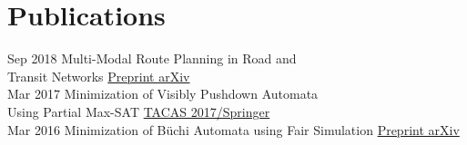\documentclass[letterpaper]{twentysecondcv} %
\begin{document}
\section{Publications}
\begin{twenty} %
	\twentyitem
    		{Sep 2018}
		{}
        		{Multi-Modal Route Planning in Road and\\Transit Networks}
        		{\href{https://arxiv.org/abs/1809.05481}{Preprint arXiv}}
        		{}
        		{}\\
	\twentyitem
    		{Mar 2017}
		{}
        		{Minimization of Visibly Pushdown Automata\\Using Partial Max-SAT}
        		{\href{https://link.springer.com/chapter/10.1007/978-3-662-54577-5_27}{TACAS 2017/Springer}}
        		{}
        		{}\\
        	\twentyitem
    		{Mar 2016}
		{}
        		{Minimization of Büchi Automata using Fair Simulation}
        		{\href{https://arxiv.org/abs/1603.01107}{Preprint arXiv}}
        		{}
        		{}
\end{twenty}

\vspace{6mm}

\end{document}
